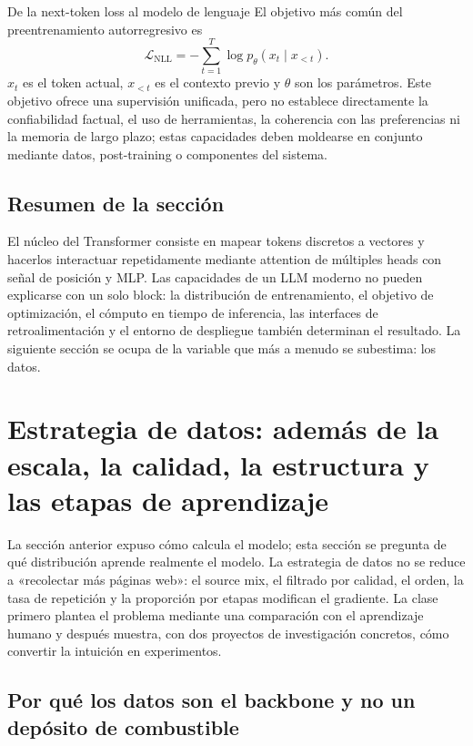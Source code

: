 \documentclass[a4paper]{article}
\begin{document}
\begin{knowledgebox}{De la next-token loss al modelo de lenguaje}
El objetivo más común del preentrenamiento autorregresivo es
\[
\mathcal{L}_{\text{NLL}}=-\sum_{t=1}^{T}\log p_{\theta}(x_t\mid x_{<t}).
\]
$x_t$ es el token actual, $x_{<t}$ es el contexto previo y $\theta$ son los parámetros. Este objetivo ofrece una supervisión unificada, pero no establece directamente la confiabilidad factual, el uso de herramientas, la coherencia con las preferencias ni la memoria de largo plazo; estas capacidades deben moldearse en conjunto mediante datos, post-training o componentes del sistema.
\end{knowledgebox}

\subsection{Resumen de la sección}

El núcleo del Transformer consiste en mapear tokens discretos a vectores y hacerlos interactuar repetidamente mediante attention de múltiples heads con señal de posición y MLP. Las capacidades de un LLM moderno no pueden explicarse con un solo block: la distribución de entrenamiento, el objetivo de optimización, el cómputo en tiempo de inferencia, las interfaces de retroalimentación y el entorno de despliegue también determinan el resultado. La siguiente sección se ocupa de la variable que más a menudo se subestima: los datos.
\section{Estrategia de datos: además de la escala, la calidad, la estructura y las etapas de aprendizaje}

La sección anterior expuso cómo calcula el modelo; esta sección se pregunta de qué distribución aprende realmente el modelo. La estrategia de datos no se reduce a «recolectar más páginas web»: el source mix, el filtrado por calidad, el orden, la tasa de repetición y la proporción por etapas modifican el gradiente. La clase primero plantea el problema mediante una comparación con el aprendizaje humano y después muestra, con dos proyectos de investigación concretos, cómo convertir la intuición en experimentos.

\subsection{Por qué los datos son el backbone y no un depósito de combustible}
\end{document}
